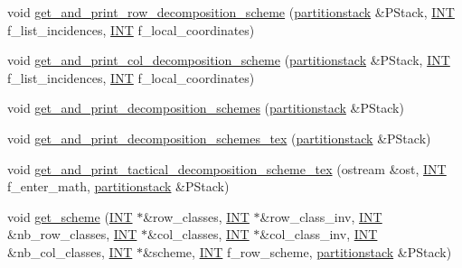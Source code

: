\begin{DoxyCompactItemize}
\item 
void \mbox{\hyperlink{classincidence__structure_a4a1e589bb5c47fb2d98fdb561b669dcf}{get\+\_\+and\+\_\+print\+\_\+row\+\_\+decomposition\+\_\+scheme}} (\mbox{\hyperlink{classpartitionstack}{partitionstack}} \&P\+Stack, \mbox{\hyperlink{galois_8h_a09fddde158a3a20bd2dcadb609de11dc}{I\+NT}} f\+\_\+list\+\_\+incidences, \mbox{\hyperlink{galois_8h_a09fddde158a3a20bd2dcadb609de11dc}{I\+NT}} f\+\_\+local\+\_\+coordinates)
\item 
void \mbox{\hyperlink{classincidence__structure_a0c51e7224f51f1434025ff6d8a10522c}{get\+\_\+and\+\_\+print\+\_\+col\+\_\+decomposition\+\_\+scheme}} (\mbox{\hyperlink{classpartitionstack}{partitionstack}} \&P\+Stack, \mbox{\hyperlink{galois_8h_a09fddde158a3a20bd2dcadb609de11dc}{I\+NT}} f\+\_\+list\+\_\+incidences, \mbox{\hyperlink{galois_8h_a09fddde158a3a20bd2dcadb609de11dc}{I\+NT}} f\+\_\+local\+\_\+coordinates)
\item 
void \mbox{\hyperlink{classincidence__structure_a95766a2ffb220bae98b60ed3c91bce9a}{get\+\_\+and\+\_\+print\+\_\+decomposition\+\_\+schemes}} (\mbox{\hyperlink{classpartitionstack}{partitionstack}} \&P\+Stack)
\item 
void \mbox{\hyperlink{classincidence__structure_a2a9844501c86ee7588a64227cc6867e5}{get\+\_\+and\+\_\+print\+\_\+decomposition\+\_\+schemes\+\_\+tex}} (\mbox{\hyperlink{classpartitionstack}{partitionstack}} \&P\+Stack)
\item 
void \mbox{\hyperlink{classincidence__structure_a88a5db2769f6529b86c1ee250ceed24d}{get\+\_\+and\+\_\+print\+\_\+tactical\+\_\+decomposition\+\_\+scheme\+\_\+tex}} (ostream \&ost, \mbox{\hyperlink{galois_8h_a09fddde158a3a20bd2dcadb609de11dc}{I\+NT}} f\+\_\+enter\+\_\+math, \mbox{\hyperlink{classpartitionstack}{partitionstack}} \&P\+Stack)
\item 
void \mbox{\hyperlink{classincidence__structure_a13191a7c41cd54c5a453e82395893ad9}{get\+\_\+scheme}} (\mbox{\hyperlink{galois_8h_a09fddde158a3a20bd2dcadb609de11dc}{I\+NT}} $\ast$\&row\+\_\+classes, \mbox{\hyperlink{galois_8h_a09fddde158a3a20bd2dcadb609de11dc}{I\+NT}} $\ast$\&row\+\_\+class\+\_\+inv, \mbox{\hyperlink{galois_8h_a09fddde158a3a20bd2dcadb609de11dc}{I\+NT}} \&nb\+\_\+row\+\_\+classes, \mbox{\hyperlink{galois_8h_a09fddde158a3a20bd2dcadb609de11dc}{I\+NT}} $\ast$\&col\+\_\+classes, \mbox{\hyperlink{galois_8h_a09fddde158a3a20bd2dcadb609de11dc}{I\+NT}} $\ast$\&col\+\_\+class\+\_\+inv, \mbox{\hyperlink{galois_8h_a09fddde158a3a20bd2dcadb609de11dc}{I\+NT}} \&nb\+\_\+col\+\_\+classes, \mbox{\hyperlink{galois_8h_a09fddde158a3a20bd2dcadb609de11dc}{I\+NT}} $\ast$\&scheme, \mbox{\hyperlink{galois_8h_a09fddde158a3a20bd2dcadb609de11dc}{I\+NT}} f\+\_\+row\+\_\+scheme, \mbox{\hyperlink{classpartitionstack}{partitionstack}} \&P\+Stack)

\end{DoxyCompactItemize}

